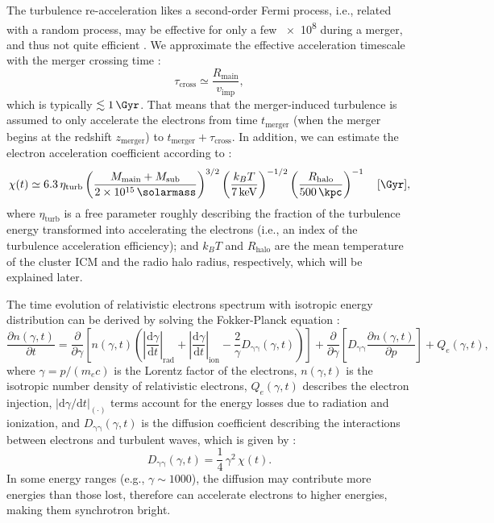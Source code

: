 \documentclass[modern]{aastex61}
\newcommand{\R}[1]{\mathrm{#1}}
\newcommand{\D}[1]{\R{d} #1}
\newcommand{\diff}[2]{\frac{\D{#1}}{\D{#2}}}
\newcommand{\pdiff}[2]{\frac{\partial #1}{\partial #2}}
\begin{document}
The turbulence re-acceleration likes a second-order Fermi process, i.e.,
related with a random process, may be effective for only a few
\SI{e8}{\year} during a merger, and thus not quite efficient
\citep{feretti2012rev,ensslin2011}.
We approximate the effective acceleration timescale with the merger
crossing time \citep{cassano2005}:
\begin{equation}
  \label{eq:tau-cross}
  \tau_{\R{cross}} \simeq \frac{R_{\R{main}}}{v_{\R{imp}}},
\end{equation}
which is typically $\lesssim \SI{1}{\Gyr}$.
That means that the merger-induced turbulence is assumed to only accelerate
the electrons from time $t_{\R{merger}}$ (when the merger begins at the
redshift $z_{\R{merger}}$) to $t_{\R{merger}} + \tau_{\R{cross}}$.
In addition, we can estimate the electron acceleration coefficient
according to \citep{cassano2005}:
\begin{equation}
  \label{eq:electron-acc}
  \chi(t) \simeq 6.3 \,\eta_{\R{turb}}
      \left( \frac{M_{\R{main}} + M_{\R{sub}}}{\SI{2e15}{\solarmass}} \right)^{3/2}
      \left( \frac{k_BT}{\SI{7}{\keV}} \right)^{-1/2}
      \left( \frac{R_{\R{halo}}}{\SI{500}{\kpc}} \right)^{-1}
  \quad [\si{\per\Gyr}],
\end{equation}
where $\eta_{\R{turb}}$ is a free parameter roughly describing the fraction
of the turbulence energy transformed into accelerating the electrons (i.e.,
an index of the turbulence acceleration efficiency);
and $k_BT$ and $R_{\R{halo}}$ are the mean temperature of the cluster ICM
and the radio halo radius, respectively, which will be explained later.

The time evolution of relativistic electrons spectrum with isotropic energy
distribution can be derived by solving the Fokker-Planck equation
\citep{eilek1991,schlickeiser2002}:
\begin{equation}
  \label{eq:fokkerplanck}
  \pdiff{n(\gamma,t)}{t} = \pdiff{}{\gamma} \left[ n(\gamma,t) \left(
      \left| \diff{\gamma}{t} \right|_{\R{rad}} +
      \left| \diff{\gamma}{t} \right|_{\R{ion}} -
      \frac{2}{\gamma} D_{\R{\gamma\gamma}}(\gamma, t) \right) \right] +
  \pdiff{}{\gamma} \left[ D_{\R{\gamma\gamma}} \pdiff{n(\gamma,t)}{p} \right] +
  Q_e(\gamma,t),
\end{equation}
where $\gamma = p / (m_e c)$ is the Lorentz factor of the electrons,
$n(\gamma, t)$ is the isotropic number density of relativistic
electrons, $Q_e(\gamma, t)$ describes the electron injection,
$|\R{d}\gamma / \R{d}t|_{(\cdot)}$ terms account for the
energy losses due to radiation and ionization,
and $D_{\R{\gamma\gamma}}(\gamma, t)$ is the diffusion coefficient
describing the interactions between electrons and turbulent waves,
which is given by \citep{brunetti2011}:
\begin{equation}
  \label{eq:diffusion-coef}
  D_{\R{\gamma\gamma}}(\gamma, t) = \frac{1}{4} \,\gamma^2\,\chi(t).
\end{equation}
In some energy ranges (e.g., $\gamma \sim 1000$), the diffusion may
contribute more energies than those lost, therefore can accelerate electrons
to higher energies, making them synchrotron bright.
\end{document}
